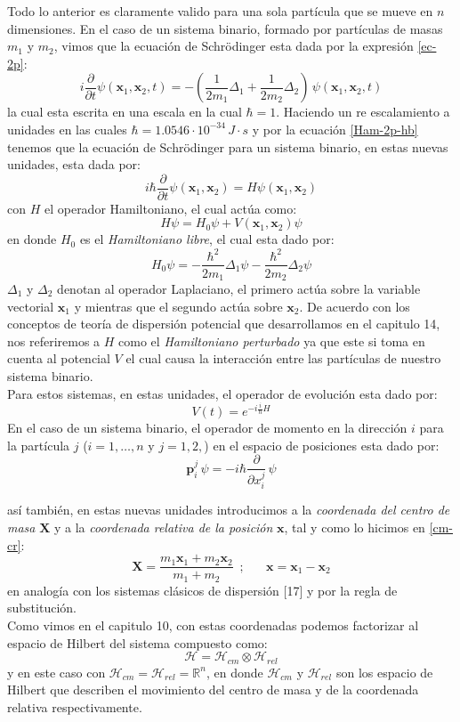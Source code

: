\documentclass[12pt]{book}
\numberwithin{equation}{chapter}
\def\R{\mathbb{R}}
\def\H{\mathcal{H}}
\def\pr{\otimes}
\def\x{\mathbf{x}}
\def\xx{\mathbf{X}}
\def\P{\mathbf{p}}
\begin{document}
Todo lo anterior es claramente valido para una sola part\'icula que se mueve en $n$ dimensiones. En el caso de un sistema binario, formado por part\'iculas de masas $m_{1}$ y $m_{2}$, vimos que la ecuaci\'on de Schr\"odinger esta dada por la expresi\'on \eqref{ec-2p}:
$$ i \frac{\partial}{ \partial t } \psi (\x_{1} , \x_{2},t)= - \left( \frac{1}{2m_{1}} \Delta_{1} + \frac{1}{2m_{2}} \Delta_{2} \right) \, \psi (\x_{1},\x_{2},t)  $$
la cual esta escrita en una escala en la cual $\hbar =1$. Haciendo un re escalamiento a unidades en las cuales $\hbar= 1.0546 \cdot 10^{-34} \, J \cdot s$ y por la ecuaci\'on \eqref{Ham-2p-hb} tenemos que la ecuaci\'on de Schr\"odinger para un sistema binario, en estas nuevas unidades, esta dada por:
$$ i\hbar \frac{\partial}{\partial t} \psi(\x_{1},\x_{2})= H\psi(\x_{1},\x_{2}) $$
con $H$ el operador Hamiltoniano, el cual act\'ua como:
\begin{equation}\label{ham}
H \psi =H_{0} \psi + V(\x_{1} , \x_{2}) \psi
\end{equation}
en donde $H_{0}$ es el \emph{Hamiltoniano libre}, el cual esta dado por:
\begin{equation}\label{H-lib}
H_{0}\psi=-\frac{\hbar^{2}}{2m_{1}} \Delta_{1}\psi - \frac{\hbar^{2}}{2m_{2}} \Delta_{2} \psi
\end{equation}
$\Delta_{1}$ y $\Delta_{2}$ denotan al operador Laplaciano, el primero act\'ua sobre la variable vectorial $\x_{1}$ y mientras que el segundo act\'ua sobre $\x_{2}$. De acuerdo con los conceptos de teor\'ia de dispersi\'on potencial que desarrollamos en el capitulo 14, nos referiremos a $H$ como el \emph{Hamiltoniano perturbado} ya que este si toma en cuenta al potencial $V$ el cual causa la interacci\'on entre las part\'iculas de nuestro sistema binario.\\
Para estos sistemas, en estas unidades, el operador de evoluci\'on esta dado por:
$$ V(t)= e^{-i \frac{i}{\hbar} H}  $$
En el caso de un sistema binario, el operador de momento en la direcci\'on $i$ para la part\'icula $j$ ($i=1,\ldots,n$ y $j=1,2,$) en el espacio de posiciones esta dado por:
$$ \P_{i}^{j}\, \psi=  -i\hbar \frac{\partial }{\partial x_{i}^{j}} \, \psi   $$

as\'i tambi\'en, en estas nuevas unidades introducimos a la \emph{coordenada del centro de masa} $\xx$ y a la \emph{coordenada relativa de la posici\'on} $\x$, tal y como lo hicimos en \eqref{cm-cr}:
\begin{equation}\label{cm-cr-h}
\xx = \frac{ m_{1}\x_{1} + m_{2}\x_{2} }{m_{1}+m_{2}} \,\,\,;\,\,\,\,\,\,\,\,\,\, \x= \x_{1} - \x_{2}
\end{equation}
en analog\'ia con los sistemas cl\'asicos de dispersi\'on [17] y por la regla de substituci\'on.\\ 
Como vimos en el capitulo 10, con estas coordenadas podemos factorizar al espacio de Hilbert del sistema compuesto como:
$$ \H= \H_{cm} \pr \H_{rel} $$
y en este caso con $\H_{cm}=\H_{rel}=\R^{n}$, en donde $\H_{cm}$ y $\H_{rel}$ son los espacio de Hilbert que describen el movimiento del centro de masa y de la coordenada relativa respectivamente.\\
\end{document}
